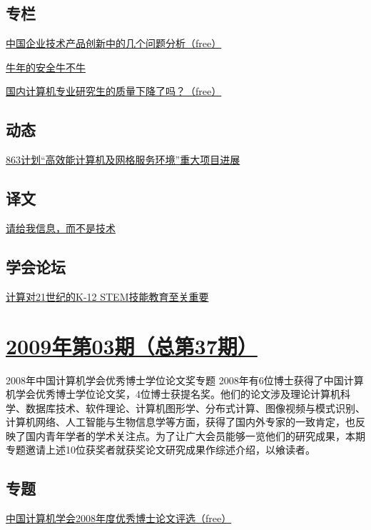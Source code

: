 \documentclass[a4paper]{article}
\begin{document}
\subsection{专栏}
\href{http://history.ccf.org.cn/resources/1190201776262/2010/04/15/038060.pdf}{中国企业技术产品创新中的几个问题分析（free）}

\href{http://history.ccf.org.cn/resources/1190201776262/2010/04/15/038067.pdf}{牛年的安全牛不牛}

\href{http://history.ccf.org.cn/resources/1190201776262/2010/04/15/038070.pdf}{国内计算机专业研究生的质量下降了吗？（free）}

\subsection{动态}
\href{http://history.ccf.org.cn/resources/1190201776262/2010/04/15/038074.pdf}{863计划“高效能计算机及网格服务环境”重大项目进展}

\subsection{译文}
\href{http://history.ccf.org.cn/resources/1190201776262/2010/04/15/038080.pdf}{请给我信息，而不是技术}

\subsection{学会论坛}
\href{http://history.ccf.org.cn/resources/1190201776262/2010/04/15/038094.pdf}{计算对21世纪的K-12 STEM技能教育至关重要}


\section{\href{http://history.ccf.org.cn/sites/ccf/jsjtbbd.jsp?contentId=2542567629028}{\textbf{2009年第03期（总第37期）}}}
2008年中国计算机学会优秀博士学位论文奖专题 2008年有6位博士获得了中国计算机学会优秀博士学位论文奖，4位博士获提名奖。他们的论文涉及理论计算机科学、数据库技术、软件理论、计算机图形学、分布式计算、图像视频与模式识别、计算机网络、人工智能与生物信息学等方面，获得了国内外专家的一致肯定，也反映了国内青年学者的学术关注点。为了让广大会员能够一览他们的研究成果，本期专题邀请上述10位获奖者就获奖论文研究成果作综述介绍，以飨读者。
\subsection{专题}
\href{http://history.ccf.org.cn/resources/1190201776262/2010/04/15/037010.pdf}{中国计算机学会2008年度优秀博士论文评选（free）}
\end{document}
